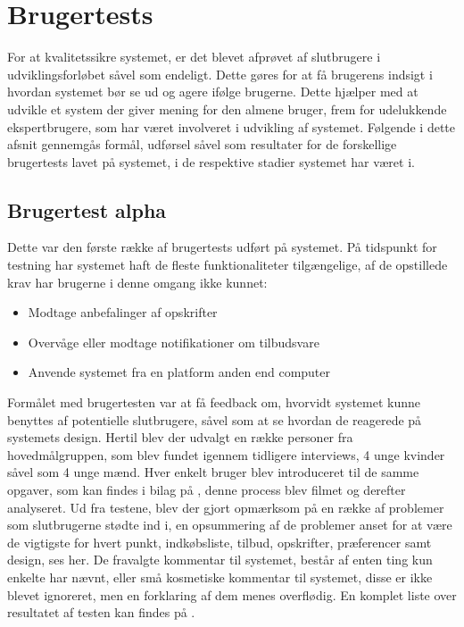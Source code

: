 \section{Brugertests}
For at kvalitetssikre systemet, er det blevet afprøvet af slutbrugere i udviklingsforløbet såvel som endeligt.
Dette gøres for at få brugerens indsigt i hvordan systemet bør se ud og agere ifølge brugerne.
Dette hjælper med at udvikle et system der giver mening for den almene bruger, frem for udelukkende ekspertbrugere, som har været involveret i udvikling af systemet.
Følgende i dette afsnit gennemgås formål, udførsel såvel som resultater for de forskellige brugertests lavet på systemet, i de respektive stadier systemet har været i.


\subsection{Brugertest alpha}
Dette var den første række af brugertests udført på systemet.
På tidspunkt for testning har systemet haft de fleste funktionaliteter tilgængelige, af de opstillede krav har brugerne i denne omgang ikke kunnet:
\begin{itemize}
   \item{Modtage anbefalinger af opskrifter}
   \item{Overvåge eller modtage notifikationer om tilbudsvare}
   \item{Anvende systemet fra en platform anden end computer}
\end{itemize}
Formålet med brugertesten var at få feedback om, hvorvidt systemet kunne benyttes af potentielle slutbrugere, såvel som at se hvordan de reagerede på systemets design.
Hertil blev der udvalgt en række personer fra hovedmålgruppen, som blev fundet igennem tidligere interviews, 4 unge kvinder såvel som 4 unge mænd.
Hver enkelt bruger blev introduceret til de samme opgaver, som kan findes i bilag på , denne process blev filmet og derefter analyseret.
Ud fra testene, blev der gjort opmærksom på en række af problemer som slutbrugerne stødte ind i, en opsummering af de problemer anset for at være de vigtigste for hvert punkt, indkøbsliste, tilbud, opskrifter, præferencer samt design, ses her.
De fravalgte kommentar til systemet, består af enten ting kun enkelte har nævnt, eller små kosmetiske kommentar til systemet, disse er ikke blevet ignoreret, men en forklaring af dem menes overflødig.	
En komplet liste over resultatet af testen kan findes på .
